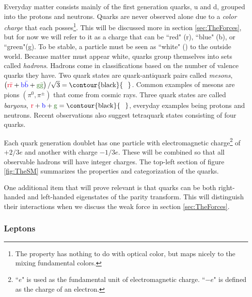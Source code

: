 Everyday matter consists mainly of the first generation quarks, u and d, grouped into the protons and neutrons. Quarks are never observed alone due to a \textit{color charge} that each posses\footnote{The property has nothing to do with optical color, but maps nicely to the mixing fundamental colors.}. This will be discussed more in section \ref{sec:TheForces}, but for now we will refer to it as a charge that can be ``red" (\textcolor{myred}{r}), ``blue" (\textcolor{myblue}{b}), or ``green"(\textcolor{mygreen}{g}). To be stable, a particle must be seen as  ``white" () to the outside world. Because matter must appear white, quarks group themselves into sets called \textit{hadrons}. Hadrons come in classifications based on the number of valence quarks they have. Two quark states are quark-antiquark pairs called \textit{mesons}, $\left(\textrm{\textcolor{myred}{r}}\textcolor{myred}{\bar{\textrm{r}}} + \textrm{\textcolor{myblue}{b}}\textcolor{myblue}{\bar{\textrm{b}}} + \textrm{\textcolor{mygreen}{g}}\textcolor{mygreen}{\bar{\textrm{g}}}\right)/\sqrt{3} = \textrm{\contour{black}{\textcolor{white}{w}}}$. Common examples of mesons are pions $\left(\pi^{0},\pi^{\pm}\right)$ that come from cosmic rays. Three quark states are called \textit{baryons}, $\mathrm{\textcolor{myred}{r}} + \mathrm{\textcolor{myblue}{b}} + \mathrm{\textcolor{mygreen}{g}} = \mathrm{\contour{black}{\textcolor{white}{w}}}$, everyday examples being protons and neutrons. Recent observations also suggest tetraquark states \cite{Aaij:2014jqa} consisting of four quarks. 

Each quark generation doublet has one particle with electromagnetic charge\footnote{``$e$" is used as the fundamental unit of electromagnetic charge. ``$-e$" is defined as the charge of an electron.} of $+2/3 e$ and another with charge $-1/3 e$. These will be combined so that all observable hadrons will have integer charges. The top-left section of figure \ref{fig:TheSM} summarizes the properties and categorization of the quarks. 

One additional item that will prove relevant is that quarks can be both right-handed and left-handed eigenstates of the parity transform. This will distinguish their interactions when we discuss the weak force in section \ref{sec:TheForces}.

\subsubsection{Leptons}
\label{sec:TheLeptons}

